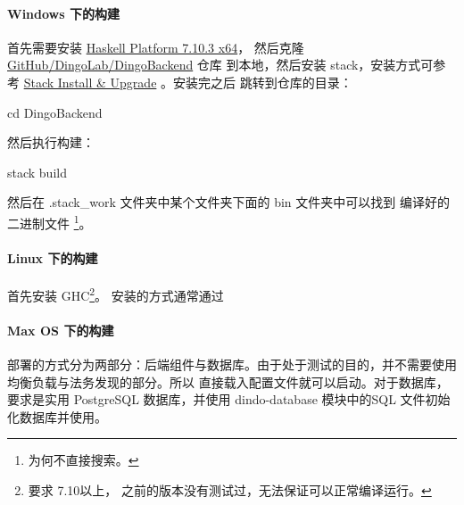 \documentclass{dingo}
\begin{document}
					\paragraph{Windows 下的构建}
						首先需要安装 \href{https://www.haskell.org/platform/windows.html}{Haskell Platform 7.10.3 x64}，
						然后克隆 \href{https://github.com/DingoLab/DingoBackend}{GitHub/DingoLab/DingoBackend} 仓库
						到本地，然后安装 stack，安装方式可参考 \href{https://github.com/commercialhaskell/stack/blob/master/doc/install_and_upgrade.md#windows}{Stack Install \& Upgrade}
						。安装完之后 跳转到仓库的目录：
						\begin{cmd}
							cd DingoBackend
						\end{cmd}
						然后执行构建：
						\begin{cmd}
							stack build
						\end{cmd}
						然后在 .stack\_work 文件夹中某个文件夹下面的 bin 文件夹中可以找到 编译好的二进制文件
						\footnote{为何不直接搜索。}。

					\paragraph{Linux 下的构建}
						首先安装 GHC\footnote{要求 7.10以上， 之前的版本没有测试过，无法保证可以正常编译运行。}。
						安装的方式通常通过

					\paragraph{Max OS 下的构建}

					部署的方式分为两部分：后端组件与数据库。由于处于测试的目的，并不需要使用均衡负载与法务发现的部分。所以
					直接载入配置文件就可以启动。对于数据库，要求是实用 PostgreSQL 数据库，并使用 dindo-database 模块中的SQL
					文件初始化数据库并使用。
\end{document}
